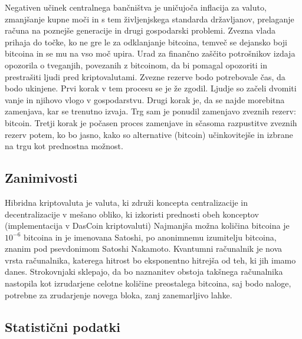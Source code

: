 \documentclass[letterpaper, titlepage, freqn]{article}
\begin{document}
Negativen učinek centralnega bančništva je uničujoča inflacija za valuto, zmanjšanje kupne moči in s tem življenjskega standarda državljanov, prelaganje računa na poznejše generacije in drugi gospodarski problemi.
Zvezna vlada prihaja do točke, ko ne gre le za odklanjanje bitcoina, temveč se dejansko boji bitcoina in se mu na vso moč upira. Urad za finančno zaščito potrošnikov izdaja opozorila o tveganjih, povezanih z bitcoinom, da bi pomagal opozoriti in prestrašiti ljudi pred kriptovalutami.
Zvezne rezerve bodo potrebovale čas, da bodo ukinjene. Prvi korak v tem procesu se je že zgodil. Ljudje so začeli dvomiti vanje in njihovo vlogo v gospodarstvu. Drugi korak je, da se najde morebitna zamenjava, kar se trenutno izvaja. Trg sam je ponudil zamenjavo zveznih rezerv: bitcoin. Tretji korak je počasen proces zamenjave in sčasoma razpustitve zveznih rezerv potem, ko bo jasno, kako so alternative (bitcoin) učinkovitejše in izbrane na trgu kot prednostna možnost.\\

\subsection{ Zanimivosti}

Hibridna kriptovaluta je valuta, ki združi koncepta centralizacije in decentralizacije v mešano obliko, ki izkoristi prednosti obeh konceptov (implementacija v DasCoin kriptovaluti)
Najmanjša možna količina bitcoina je $10^{-6}$ bitcoina in je imenovana Satoshi, po anonimnemu izumitelju bitcoina, znanim pod psevdonimom Satoshi Nakamoto.
Kvantumni računalnik je nova vrsta računalnika, katerega hitrost bo eksponentno hitrejša od teh, ki jih imamo danes. Strokovnjaki sklepajo, da bo naznanitev obstoja takšnega računalnika nastopila kot izrudarjene celotne količine preostalega bitcoina, saj bodo naloge, potrebne za zrudarjenje novega bloka, zanj zanemarljivo lahke.\\

\subsection{Statistični podatki}
\end{document}
